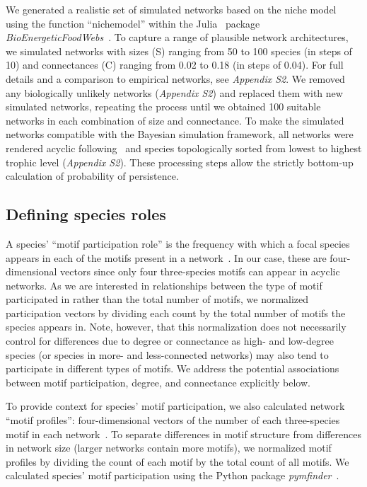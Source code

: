 \documentclass[12pt]{article}
\begin{document}
\begin{spacing}{2.0}
		We generated a realistic set of simulated networks based on the niche model~\citep{Williams2000,Stouffer2007} using the function ``nichemodel'' within the Julia~\citep{Bezanson2017julia} package \emph{BioEnergeticFoodWebs}~\citep{bioenergfw,Delmas2017}. 
		To capture a range of plausible network architectures, we simulated networks with sizes (S) ranging from 50 to 100 species (in steps of 10) and connectances (C) ranging from 0.02 to 0.18 (in steps of 0.04). 
		For full details and a comparison to empirical networks, see \emph{Appendix S2}.
		We removed any biologically unlikely networks (\emph{Appendix S2}) and replaced them with new simulated networks, repeating the process until we obtained 100 suitable networks in each combination of size and connectance.
		To make the simulated networks compatible with the Bayesian simulation framework, all networks were rendered acyclic following~\citet{Allesina2009functional} and species topologically sorted from lowest to highest trophic level (\emph{Appendix S2}). 
		 These processing steps allow the strictly bottom-up calculation of probability of persistence.
		
		
	\subsection*{Defining species roles}

        A species' ``motif participation role'' is the frequency with which a focal species appears in each of the motifs present in a network~\citep{Stouffer2012}.
        In our case, these are four-dimensional vectors since only four three-species motifs can appear in acyclic networks.
        As we are interested in relationships between the type of motif participated in rather than the total number of motifs, we normalized participation vectors by dividing each count by the total number of motifs the species appears in.
        Note, however, that this normalization does not necessarily control for differences due to degree or connectance as high- and low-degree species (or species in more- and less-connected networks) may also tend to participate in different types of motifs.
        We address the potential associations between motif participation, degree, and connectance explicitly below. 
        
        
        To provide context for species' motif participation, we also calculated network ``motif profiles'': four-dimensional vectors of the number of each three-species motif in each network~\citep{Stouffer2012}.
        To separate differences in motif structure from differences in network size (larger networks contain more motifs), we normalized motif profiles by dividing the count of each motif by the total count of all motifs. 
		We calculated species' motif participation using the Python package \emph{pymfinder}~\citep{pymfinder}.



\end{spacing}
\end{document}
